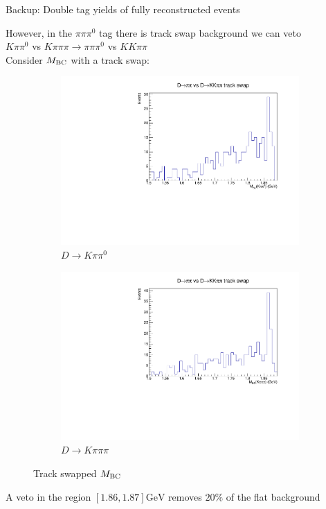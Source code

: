 \documentclass{beamer}
\begin{document}
\begin{frame}{Backup: Double tag yields of fully reconstructed events}
  \begin{center}
    However, in the $\pi\pi\pi^0$ tag there is track swap background we can veto\\
    $K\pi\pi^0$ vs $K\pi\pi\pi\rightarrow\pi\pi\pi^0$ vs $KK\pi\pi$\\
    Consider $M_{\rm BC}$ with a track swap:
  \end{center}
  \begin{figure}
    \centering
    \begin{subfigure}{0.4\textwidth}
      \includegraphics[width = 1.0\textwidth]{Plots/pipipi0_TrackSwap_Kpipi0_MBC.pdf}
      \caption{$D\to K\pi\pi^0$}
    \end{subfigure}%
    \begin{subfigure}{0.4\textwidth}
      \includegraphics[width = 1.0\textwidth]{Plots/pipipi0_TrackSwap_Kpipipi_MBC.pdf}
      \caption{$D\to K\pi\pi\pi$}
    \end{subfigure}
    \caption{Track swapped $M_{\rm BC}$}
  \end{figure}
  \begin{center}
    A veto in the region $[1.86, 1.87]\si{\giga\eV}$ removes $20\%$ of the flat background
  \end{center}
\end{frame}
\end{document}
